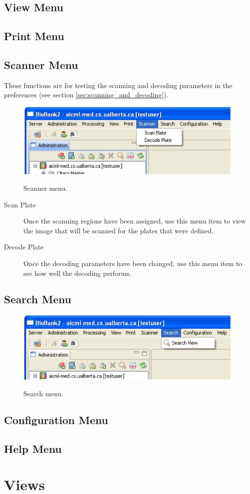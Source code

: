 \subsection{View Menu}
\subsection{Print Menu}
\subsection{Scanner Menu}
These functions are for testing the scanning and decoding parameters in the
preferences (see section \ref{sec:scanning_and_decoding}).
    \begin{figure}[H]
      \centering
      \scalebox{0.5}
      { \includegraphics*{screenshots/overview/main_menu_scanner} }
      \caption{Scanner menu.}
      \label{fig:main_menu_scanner}
    \end{figure}
\begin{description}
  \item[Scan Plate] Once the scanning regions have been assigned, use this menu
    item to view the image that will be scanned for the plates that were
    defined.
  \item[Decode Plate] Once the decoding parameters have been changed, use this
    menu item to see how well the decoding performs.
\end{description}

\subsection{Search Menu}
    \begin{figure}[H]
      \centering
      \scalebox{0.5}
      { \includegraphics*{screenshots/overview/main_menu_search} }
      \caption{Search menu.}
      \label{fig:main_menu_search}
    \end{figure}

\subsection{Configuration Menu}
\subsection{Help Menu}

\section{Views}
\label{sec:application_views}

